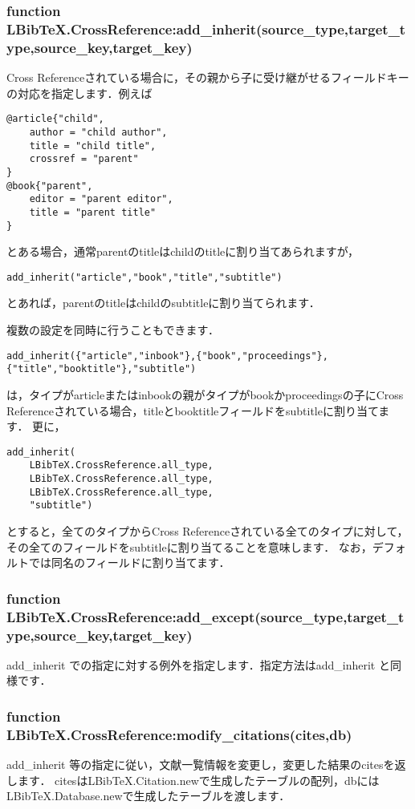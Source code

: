 \documentclass[a4paper]{ltjsarticle}
\begin{document}
\subsubsection{function LBibTeX.CrossReference:add\_inherit(source\_type,target\_type,source\_key,target\_key)}
Cross Referenceされている場合に，その親から子に受け継がせるフィールドキーの対応を指定します．例えば
\begin{verbatim}
@article{"child",
    author = "child author",
    title = "child title",
    crossref = "parent"
}
@book{"parent",
    editor = "parent editor",
    title = "parent title"
}
\end{verbatim}
とある場合，通常parentのtitleはchildのtitleに割り当てあられますが，
\begin{lstlisting}
add_inherit("article","book","title","subtitle")
\end{lstlisting}
とあれば，parentのtitleはchildのsubtitleに割り当てられます．

複数の設定を同時に行うこともできます．
\begin{lstlisting}
add_inherit({"article","inbook"},{"book","proceedings"},{"title","booktitle"},"subtitle")
\end{lstlisting}
は，タイプがarticleまたはinbookの親がタイプがbookかproceedingsの子にCross Referenceされている場合，titleとbooktitleフィールドをsubtitleに割り当てます．
更に，
\begin{lstlisting}
add_inherit(
	LBibTeX.CrossReference.all_type,
	LBibTeX.CrossReference.all_type,
	LBibTeX.CrossReference.all_type,
	"subtitle")
\end{lstlisting}
とすると，全てのタイプからCross Referenceされている全てのタイプに対して，その全てのフィールドをsubtitleに割り当てることを意味します．
なお，デフォルトでは同名のフィールドに割り当てます．

\subsubsection{function LBibTeX.CrossReference:add\_except(source\_type,target\_type,source\_key,target\_key)}
add\_inherit での指定に対する例外を指定します．指定方法はadd\_inherit と同様です．

\subsubsection{function LBibTeX.CrossReference:modify\_citations(cites,db)}
add\_inherit 等の指定に従い，文献一覧情報を変更し，変更した結果のcitesを返します．
citesはLBibTeX.Citation.newで生成したテーブルの配列，dbにはLBibTeX.Database.newで生成したテーブルを渡します．
\end{document}
